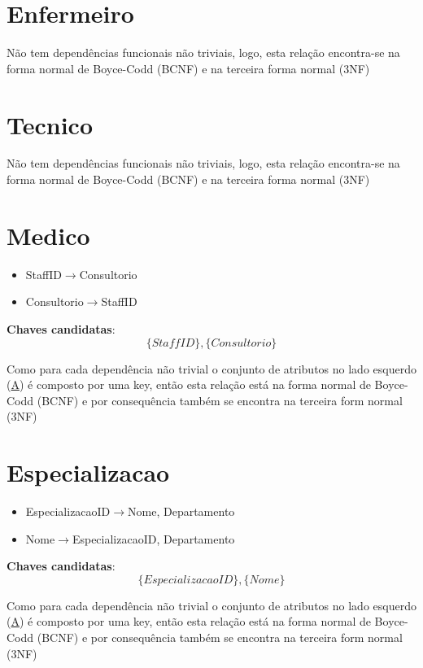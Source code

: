\documentclass[article, a4paper, 12pt, oneside]{memoir}
\begin{document}
\section*{Enfermeiro}
Não tem dependências funcionais não triviais, logo, esta relação encontra-se na forma normal de Boyce-Codd (BCNF) e na terceira forma normal (3NF)

\section*{Tecnico}
Não tem dependências funcionais não triviais, logo, esta relação encontra-se na forma normal de Boyce-Codd (BCNF) e na terceira forma normal (3NF)

\section*{Medico}
\begin{itemize}
	\item StaffID$\rightarrow$Consultorio
	\item Consultorio$\rightarrow$StaffID
\end{itemize}

\textbf{Chaves candidatas}:\\
\[
\{ StaffID \}, \{ Consultorio \}
\]

Como para cada dependência não trivial o conjunto de atributos no lado esquerdo (\underline{A}) é composto por uma key, então esta relação está na forma normal de Boyce-Codd (BCNF) e por consequência também se encontra na terceira form normal (3NF)

\section*{Especializacao}
\begin{itemize}
	\item EspecializacaoID$\rightarrow$Nome, Departamento
	\item Nome$\rightarrow$EspecializacaoID, Departamento
\end{itemize}

\textbf{Chaves candidatas}:\\
\[
\{ EspecializacaoID \}, \{ Nome \}
\]

Como para cada dependência não trivial o conjunto de atributos no lado esquerdo (\underline{A}) é composto por uma key, então esta relação está na forma normal de Boyce-Codd (BCNF) e por consequência também se encontra na terceira form normal (3NF)
\end{document}

